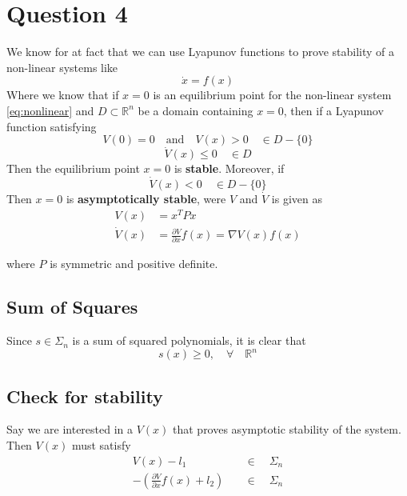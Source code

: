 \chapter{Question 4}
  We know for at fact that we can use Lyapunov functions to prove stability of a
non-linear systems like
\begin{equation}
        \dot{x} = f(x)
        \label{eq:nonlinear}
\end{equation}
Where we know that if $x = 0$ is an equilibrium point for the non-linear system \eqref{eq:nonlinear} and
$D \subset \mathbb{R}^n$ be a domain containing $x = 0$, then if a Lyapunov function satisfying
\begin{equation}
        V(0) = 0 \quad \text{and} \quad V(x) > 0 \quad \in D - \{0\}
\end{equation}
\begin{equation}
        \dot{V}(x) \leq 0 \quad \in D
\end{equation}
Then the equilibrium point $x = 0$ is \textbf{stable}. Moreover, if
\begin{equation}
        \dot{V}(x) < 0 \quad \in D - \{0\}
\end{equation}
Then $x = 0$ is \textbf{asymptotically stable}, were $V$ and $\dot{V}$ is given as
\begin{equation}
  \begin{split}
    V(x) &= x^T P x \\
    \dot{V}(x) &= \frac{\partial V}{\partial x} f(x) = \nabla V(x) f(x)
  \end{split}
\end{equation}

where $P$ is symmetric and positive definite.

\section*{Sum of Squares}
Since $s \in \Sigma_{n}$ is a sum of squared polynomials, it is clear that 
\begin{equation}
        s(x) \geq 0, \quad \forall \quad \mathbb{R}^n
\end{equation}

\section*{Check for stability}
Say we are interested in a $V(x)$ that proves asymptotic stability of the system. Then $V(x)$ must satisfy
\begin{equation}
        \begin{split}
                V(x) - l_1 \quad &\in \quad \Sigma_n \\
                -\left(\frac{\partial V}{\partial x} f(x) + l_2 \right) \quad &\in \quad \Sigma_n
        \end{split}
\end{equation}
